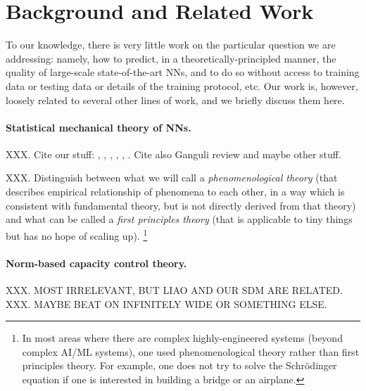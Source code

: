 \section{Background and Related Work}
\label{sxn:background}


To our knowledge, there is very little work on the particular question we are addressing: namely, how to predict, in a theoretically-principled manner, the quality of large-scale state-of-the-art NNs, and to do so without access to training data or testing data or details of the training protocol, etc.
Our work is, however, loosely related to several other lines of work, and we briefly discuss them here.

\paragraph{Statistical mechanical theory of NNs.}

XXX.
Cite our stuff:
\cite{MM17_TR},
\cite{MM18_TR},
\cite{MM19_HTSR_ICML},
\cite{weightwatcher_package}
\cite{MM19_KDD},
\cite{MM20_SDM},
\cite{MM20_unpub_work}.
Cite also Ganguli review and maybe other stuff.

XXX.
Distinguish between what we will call a
\emph{phenomenological theory}
(that describes empirical relationship of phenomena to each other, in a way which is consistent with fundamental theory, but is not directly derived from that theory)
and what can be called a 
\emph{first principles theory} 
(that is applicable to tiny things but has no hope of scaling up).
\footnote{In most areas where there are complex highly-engineered systems (beyond complex AI/ML systems), one used phenomenological theory rather than first principles theory.  For example, one does not try to solve the Schr\"odinger equation if one is interested in building a bridge or an airplane.}

\paragraph{Norm-based capacity control theory.}
XXX.  MOST IRRELEVANT, BUT LIAO AND OUR SDM ARE RELATED.  
XXX.  MAYBE BEAT ON INFINITELY WIDE OR SOMETHING ELSE.

